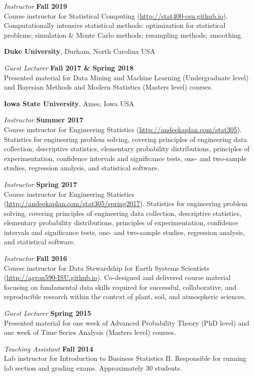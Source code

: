 \documentclass[margin,line]{res}
\begin{document}
\begin{resume}
{\em Instructor} \hfill {\bf Fall 2019}\\
Course instructor for Statistical Computing (\url{http://stat400-csu.github.io}). Computationally intensive statistical methods: optimization for statistical problems; simulation \& Monte Carlo methods; resampling methods; smoothing.

{\bf Duke University}, Durham, North Carolina USA

{\em Guest Lecturer} \hfill {\bf Fall 2017 \& Spring 2018}\\
Presented material for Data Mining and Machine Learning (Undergraduate level) and Bayesian Methods and Modern Statistics (Masters level) courses.

{\bf Iowa State University}, Ames, Iowa USA

{\em Instructor} \hfill {\bf Summer 2017}\\
Course instructor for Engineering Statistics (\url{http://andeekaplan.com/stat305}). Statistics for engineering problem solving, covering principles of engineering data collection, descriptive statistics, elementary probability distributions, principles of experimentation, confidence intervals and significance tests, one- and two-sample studies, regression analysis, and statistical software.

{\em Instructor} \hfill {\bf Spring 2017}\\
Course instructor for Engineering Statistics (\url{http://andeekaplan.com/stat305/spring2017}). Statistics for engineering problem solving, covering principles of engineering data collection, descriptive statistics, elementary probability distributions, principles of experimentation, confidence intervals and significance tests, one- and two-sample studies, regression analysis, and statistical software.

{\em Instructor} \hfill {\bf Fall 2016}\\
Course instructor for Data Stewardship for Earth Systems Scientists (\url{http://agron590-ISU.github.io}). Co-designed
and delivered course material focusing on fundamental data skills required for successful,
collaborative, and reproducible research within the context of plant, soil, and atmospheric sciences.

{\em Guest Lecturer} \hfill {\bf Spring 2015}\\
Presented material for one week of Advanced Probability Theory (PhD level) and one week of Time Series Analysis (Masters level) courses.

{\em Teaching Assistant} \hfill {\bf Fall 2014}\\
Lab instructor for Introduction to Business Statistics II. Responsible for running lab section and grading exams. Approximately 30 students.


\end{resume}
\end{document}
